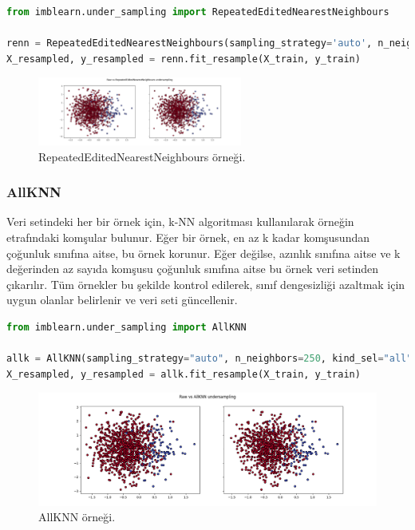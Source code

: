 \begin{lstlisting}[language=Python]
from imblearn.under_sampling import RepeatedEditedNearestNeighbours

renn = RepeatedEditedNearestNeighbours(sampling_strategy='auto', n_neighbors=200, kind_sel='all', max_iter=250)
X_resampled, y_resampled = renn.fit_resample(X_train, y_train)
\end{lstlisting}

\begin{figure}[h]
    \centering
    \includegraphics[width=0.6\textwidth]{images/Raw vs RepeatedEditedNearestNeighbours undersampling.png}
    \caption{RepeatedEditedNearestNeighbours örneği.}
    \label{fig:enter-label}
\end{figure}

\subsubsection{AllKNN}
Veri setindeki her bir örnek için, k-NN algoritması kullanılarak örneğin etrafındaki komşular bulunur. Eğer bir örnek, en az k kadar komşusundan çoğunluk sınıfına aitse, bu örnek korunur. Eğer değilse, azınlık sınıfına aitse ve k değerinden az sayıda komşusu çoğunluk sınıfına aitse bu örnek veri setinden çıkarılır. Tüm örnekler bu şekilde kontrol edilerek, sınıf dengesizliği azaltmak için uygun olanlar belirlenir ve veri seti güncellenir.

\begin{lstlisting}[language=Python]
from imblearn.under_sampling import AllKNN

allk = AllKNN(sampling_strategy="auto", n_neighbors=250, kind_sel="all")
X_resampled, y_resampled = allk.fit_resample(X_train, y_train)
\end{lstlisting}

\begin{figure}[h]
    \centering
    \includegraphics[width=1\textwidth]{images/Raw vs AllKNN undersampling.png}
    \caption{AllKNN örneği.}
    \label{fig:enter-label}
\end{figure}

